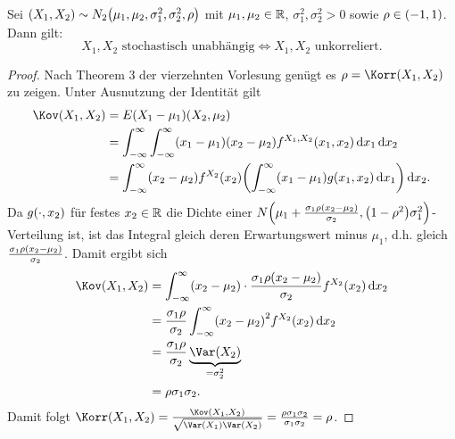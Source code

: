 \documentclass{lecture}
\begin{document}
    \begin{theorem}
        Sei \(\parentheses*{X_1, X_2} \sim N_2\parentheses*{\mu_1, \mu_2, \sigma_1^2, \sigma_2^2, \rho}\) mit \(\mu_1, \mu_2 \in \R\), \(\sigma_1^2, \sigma_2^2 > 0\) sowie \(\rho \in \parentheses*{-1, 1}\).
        Dann gilt:
        \[
            X_1, X_2\text{ stochastisch unabhängig} \iff X_1, X_2\text{ unkorreliert}.
        \]
    \end{theorem}

    \begin{proof}
        Nach Theorem 3 der vierzehnten Vorlesung genügt es \(\rho = \Korr\parentheses*{X_1, X_2}\) zu zeigen.
        Unter Ausnutzung der Identität gilt
        \begin{align*}
            \Kov\parentheses*{X_1, X_2} &= E\parentheses*{X_1 - \mu_1}\parentheses*{X_2, \mu_2}\\
            &= \int_{-\infty}^\infty \int_{-\infty}^\infty \parentheses*{x_1 - \mu_1}\parentheses*{x_2 - \mu_2}f^{X_1, X_2}\parentheses*{x_1, x_2}\d x_1\d x_2\\
            &= \int_{-\infty}^\infty \parentheses*{x_2 - \mu_2}f^{X_2}\parentheses*{x_2}\parentheses*{\int_{-\infty}^\infty \parentheses*{x_1 - \mu_1}g\parentheses*{x_1, x_2}\d x_1}\d x_2.
        \end{align*}
        Da \(g\parentheses*{\cdot, x_2}\) für festes \(x_2 \in \R\) die Dichte einer \(N\parentheses*{\mu_1 + \frac{\sigma_1 \rho\parentheses*{x_2 - \mu_2}}{\sigma_2}, \parentheses*{1 - \rho^2}\sigma_1^2}\)-Verteilung ist, ist das Integral gleich deren Erwartungswert minus \(\mu_1\), d.h. gleich \(\frac{\sigma_1 \rho\parentheses*{x_2 - \mu_2}}{\sigma_2}\).
        Damit ergibt sich
        \begin{align*}
            \Kov\parentheses*{X_1, X_2} &= \int_{-\infty}^\infty \parentheses*{x_2 - \mu_2} \cdot \frac{\sigma_1 \rho\parentheses*{x_2 - \mu_2}}{\sigma_2}f^{X_2}\parentheses*{x_2}\d x_2\\
            &= \frac{\sigma_1 \rho}{\sigma_2}\int_{-\infty}^\infty \parentheses*{x_2 - \mu_2}^2 f^{X_2}\parentheses*{x_2}\d x_2\\
            &= \frac{\sigma_1 \rho}{\sigma_2}\underbrace{\Var\parentheses*{X_2}}_{= \sigma_2^2}\\
            &= \rho\sigma_1 \sigma_2.
        \end{align*}
        Damit folgt \(\Korr\parentheses*{X_1, X_2} = \frac{\Kov\parentheses*{X_1, X_2}}{\sqrt{\Var\parentheses*{X_1}\Var\parentheses*{X_2}}} = \frac{\rho\sigma_1 \sigma_2}{\sigma_1 \sigma_2} = \rho\).
    \end{proof}
\end{document}
